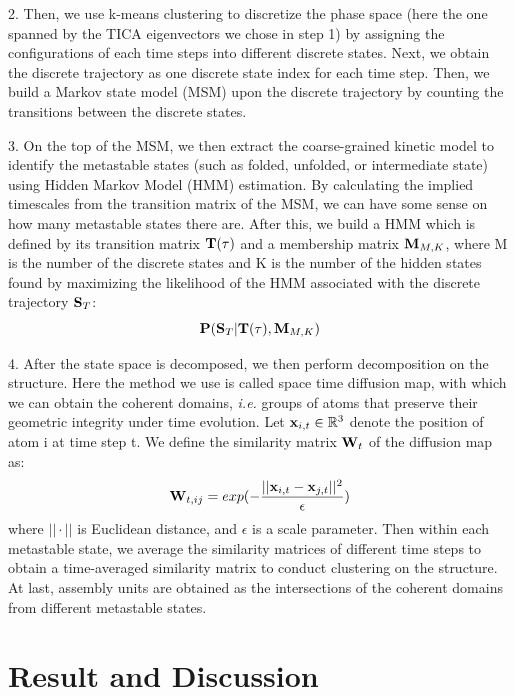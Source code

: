 \documentclass[12pt]{article}
\begin{document}
\hangindent=0.7cm
2. Then, we use k-means clustering to discretize the phase space (here the one spanned by the TICA eigenvectors we chose in step 1) by assigning the configurations of each time steps into different discrete states\cite{TICA_collective_variable,TICA_commute_map}. Next, we obtain the discrete trajectory as one discrete state index for each time step. Then, we build a Markov state model (MSM) upon the discrete trajectory by counting the transitions between the discrete states\cite{MSM}.

\hangindent=0.7cm
3. On the top of the MSM, we then extract the coarse-grained kinetic model to identify the metastable states (such as folded, unfolded, or intermediate state) using Hidden Markov Model (HMM) estimation. By calculating the implied timescales from the transition matrix of the MSM, we can have some sense on how many metastable states there are. After this, we build a HMM which is defined by its transition matrix ${\bf T}(\tau)$ and a membership matrix ${\bf M}_{M,K}$\cite{HMM}, where M is the number of the discrete states and K is the number of the hidden states found by maximizing the likelihood of the HMM associated with the discrete trajectory ${\bf S}_{T}$:
\begin{equation}
{\bf P}({\bf S}_{T}| {\bf T}(\tau),{\bf M}_{M,K})
\end{equation}

\hangindent=0.7cm
4. After the state space is decomposed, we then perform decomposition on the structure. Here the method we use is called space time diffusion map\cite{Lrenzo_S3D,diffusion_map,diffusion_map_clustering}, with which  we can obtain the coherent domains, {\it i.e.} groups of atoms that preserve their geometric integrity under time evolution. Let ${\bf x}_{i,t} \in {\mathbb R}^{3}$ denote the position of atom i at time step t. We define the similarity matrix ${\bf W}_{t}$ of the diffusion map as:
\begin{equation}
{\bf W}_{t,ij} = exp(- \frac{||{\bf x}_{i,t}-{\bf x}_{j,t}||^{2}}{\epsilon})
\end{equation}
where $||\cdot||$ is Euclidean distance, and $\epsilon$ is a scale parameter. Then within each metastable state, we average the similarity matrices of different time steps to obtain a time-averaged similarity matrix to conduct clustering on the structure. At last, assembly units are obtained as the intersections of the coherent domains from different metastable states.

\section*{Result and Discussion}
\end{document}
